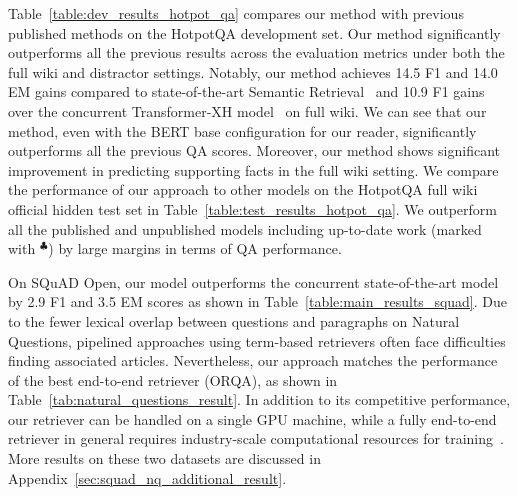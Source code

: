 Table~\ref{table:dev_results_hotpot_qa} compares our method with previous published methods on the HotpotQA development set.
Our method significantly outperforms all the previous results across the evaluation metrics under both the full wiki and distractor settings. 
Notably, our method achieves 14.5 F1 and 14.0 EM gains compared to state-of-the-art Semantic Retrieval~\citep{nie_pip_2019} and 10.9 F1 gains over the concurrent Transformer-XH model~\citep{zhao2020transformerxh} on full wiki. 
We can see that our method, even with the BERT base configuration for our reader, significantly outperforms all the previous QA scores.
Moreover, our method shows significant improvement in predicting supporting facts in the full wiki setting.
We compare the performance of our approach to other models on the HotpotQA full wiki official hidden test set in Table~\ref{table:test_results_hotpot_qa}.
We outperform all the published and unpublished models including up-to-date work (marked with $^\clubsuit$) by large margins in terms of QA performance.

On SQuAD Open, our model outperforms the concurrent state-of-the-art model~\citep{multipassage-bert-2019} by 2.9 F1 and 3.5 EM scores as shown in Table~\ref{table:main_results_squad}. 
Due to the fewer lexical overlap between questions and paragraphs on Natural Questions, pipelined approaches using term-based retrievers often face difficulties finding associated articles.
Nevertheless, our approach matches the performance of the best end-to-end retriever (ORQA), as shown in Table~\ref{tab:natural_questions_result}.
In addition to its competitive performance, our retriever can be handled on a single GPU machine, while a fully end-to-end retriever in general  requires industry-scale computational resources for training~\citep{denspi}.
More results on these two datasets are discussed in Appendix~\ref{sec:squad_nq_additional_result}.

